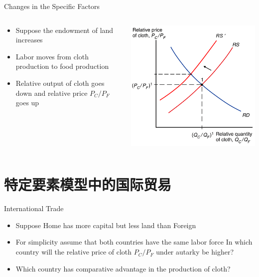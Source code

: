 \documentclass[10pt,hyperref={CJKbookmarks=true},xcolor=dvipsnames,aspectratio=169]{beamer}
\begin{document}
\begin{frame}{Changes in the Specific Factors}


\begin{columns}[onlytextwidth]
\begin{column}{0.4\textwidth}
\begin{itemize}
\item Suppose the endowment of land increases 
\item Labor moves from cloth production to food production 
\item Relative output of cloth goes down and relative price $P_{C}/P_{F}$
goes up
\end{itemize}

\end{column}
\begin{column}{0.6\textwidth}
\centering \includegraphics[width=0.8\columnwidth]{fig/sfm/lec4-20}
\end{column}
\end{columns}

\end{frame}

\section{特定要素模型中的国际贸易}
\begin{frame}{International Trade }

\begin{itemize}
\item Suppose Home has more capital but less land than Foreign 
\item For simplicity assume that both countries have the same labor force
In which country will the relative price of cloth $P_{C}/P_{F}$ under
autarky be higher? 
\item Which country has comparative advantage in the production of cloth?
\end{itemize}
\end{frame}
\end{document}
